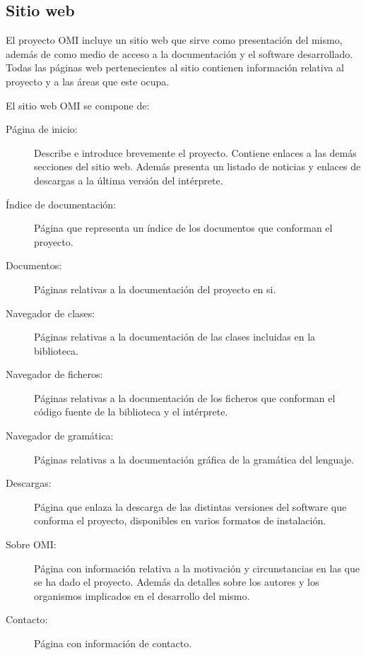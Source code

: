\subsection{Sitio web}
El proyecto OMI incluye un sitio web que sirve como presentación del mismo, además de como medio de acceso a la documentación 
y el software desarrollado. Todas las páginas web pertenecientes al sitio contienen información relativa al proyecto y a las áreas que este
ocupa. 

El sitio web OMI se compone de: 

\begin{description}
\item [Página de inicio:] Describe e introduce brevemente el proyecto. Contiene enlaces a las demás secciones del sitio web. Además presenta un
listado de noticias y enlaces de descargas a la última versión del intérprete.
\item [Índice de documentación:] Página que representa un índice de los documentos que conforman el proyecto.
\item [Documentos:] Páginas relativas a la documentación del proyecto en si.
\item [Navegador de clases:] Páginas relativas a la documentación de las clases incluidas en la biblioteca. 
\item [Navegador de ficheros:] Páginas relativas a la documentación de los ficheros que conforman 
el código fuente de la biblioteca y el intérprete.
\item [Navegador de gramática:] Páginas relativas a la documentación gráfica de la gramática del lenguaje.
\item [Descargas:] Página que enlaza la descarga de las distintas versiones del software que conforma el proyecto, disponibles en varios formatos de instalación.
\item [Sobre OMI:] Página con información relativa a la motivación y circunstancias en las que se ha dado el proyecto. Además da detalles sobre los autores y los
organismos implicados en el desarrollo del mismo.
\item [Contacto:] Página con información de contacto.
\end{description}
\pagebreak
